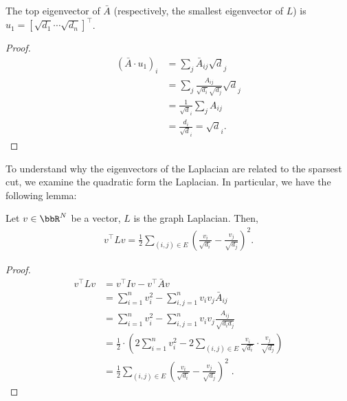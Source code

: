 \begin{lemma}
The top eigenvector of $\bar{A}$ (respectively, the smallest eigenvector of $L$) is $u_1 = [\sqrt{d_1} \cdots \sqrt{d_n}]^\top$.	
\end{lemma}
\begin{proof}
\begin{align}
	(\bar{A} \cdot u_1)_i &= \sum_j \bar{A}_{ij} \sqrt{d}_j \\
	&= \sum_j \frac{A_{ij}}{\sqrt{d_i}\sqrt{d_j}} \sqrt{d}_j \\
	&= \frac{1}{\sqrt{d}_i} \sum_j A_{ij} \\
	&= \frac{d_i}{\sqrt{d}_i} = \sqrt{d}_i.
\end{align}
\end{proof}


To understand why the eigenvectors of the Laplacian are related to the sparsest cut, we examine the quadratic form the Laplacian. In particular, we have the following lemma:
\begin{lemma}
	Let $v\in\bbR^N$ be a vector, $L$ is the graph Laplacian. Then, 
	\begin{align}
		v^\top L v = \frac{1}{2} \sum_{(i, j) \in E} \left( \frac{v_i}{\sqrt{d_i}} - \frac{v_j}{\sqrt{d_j}} \right)^2.
	\end{align}	
\end{lemma}
\begin{proof}
\begin{align}
	v^\top L v &= v^\top I v - v^\top \bar{A} v \\
	&= \sum_{i=1}^n v_i^2 - \sum_{i, j = 1}^n v_i v_j \bar{A}_{ij} \\
	&= \sum_{i=1}^n v_i^2 - \sum_{i, j = 1}^n v_i v_j \frac{A_{ij}}{\sqrt{d_i d_j}} \\
	&= \frac{1}{2}\cdot \left(2\sum_{i=1}^n v_i^2 - 2 \sum_{(i, j) \in E} \frac{v_i}{\sqrt{d_i}} \cdot \frac{v_j}{\sqrt{d_j}}\right) \\
	&= \frac{1}{2} \sum_{(i, j) \in E} \left( \frac{v_i}{\sqrt{d_i}} - \frac{v_j}{\sqrt{d_j}} \right)^2 \;.
\end{align}
\end{proof}

